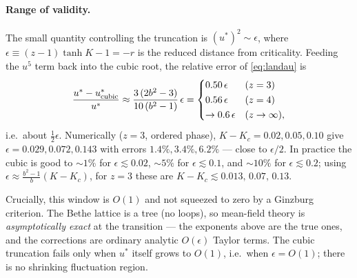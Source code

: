 \documentclass[11pt]{article}
\begin{document}
\paragraph{Range of validity.}
The small quantity controlling the truncation is $(u^*)^2\sim\epsilon$, where
$\epsilon\equiv(z-1)\tanh K-1=-r$ is the reduced distance from criticality. Feeding the $u^5$ term back
into the cubic root, the relative error of \eqref{eq:landau} is
\begin{equation}
\frac{u^*-u^*_{\rm cubic}}{u^*}\approx\frac{3\,(2b^2-3)}{10\,(b^2-1)}\,\epsilon
=\begin{cases}0.50\,\epsilon&(z=3)\\[1pt]0.56\,\epsilon&(z=4)\\[1pt]\to0.6\,\epsilon&(z\to\infty),\end{cases}
\end{equation}
i.e.\ about $\tfrac12\epsilon$. Numerically ($z=3$, ordered phase), $K{-}K_c=0.02,0.05,0.10$ give
$\epsilon=0.029,0.072,0.143$ with errors $1.4\%,3.4\%,6.2\%$ --- close to $\epsilon/2$. In practice the
cubic is good to $\sim1\%$ for $\epsilon\lesssim0.02$, $\sim5\%$ for $\epsilon\lesssim0.1$, and
$\sim10\%$ for $\epsilon\lesssim0.2$; using $\epsilon\approx\tfrac{b^2-1}{b}(K{-}K_c)$, for $z=3$ these
are $K{-}K_c\lesssim0.013,\,0.07,\,0.13$.

Crucially, this window is $O(1)$ and not squeezed to zero by a Ginzburg criterion. The Bethe lattice is a
tree (no loops), so mean-field theory is \emph{asymptotically exact} at the transition --- the exponents
above are the true ones, and the corrections are ordinary analytic $O(\epsilon)$ Taylor terms. The cubic
truncation fails only when $u^*$ itself grows to $O(1)$, i.e.\ when $\epsilon=O(1)$; there is no shrinking
fluctuation region.
\end{document}
